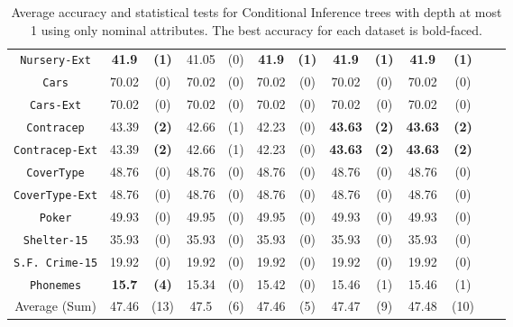 \begin{table*}
\begin{tabular}{c|cc|cc|cc|cc|cc|cc}
{\tt Nursery-Ext}  &{\bf 41.9}  & {\bf (1)} & 41.05       & (0)       & {\bf 41.9}  & {\bf (1)} & {\bf 41.9}  & {\bf (1)} & {\bf 41.9}  & {\bf (1)} &             &           \\
{\tt Cars}         &70.02       & (0)       & 70.02       & (0)       & 70.02       & (0)       & 70.02       & (0)       & 70.02       & (0)       &             &           \\
{\tt Cars-Ext}     &70.02       & (0)       & 70.02       & (0)       & 70.02       & (0)       & 70.02       & (0)       & 70.02       & (0)       &             &           \\
{\tt Contracep}    &43.39       & {\bf (2)} & 42.66       & (1)       & 42.23       & (0)       & {\bf 43.63} & {\bf (2)} & {\bf 43.63} & {\bf (2)} &             &           \\
{\tt Contracep-Ext}&43.39       & {\bf (2)} & 42.66       & (1)       & 42.23       & (0)       & {\bf 43.63} & {\bf (2)} & {\bf 43.63} & {\bf (2)} &             &           \\
{\tt CoverType}    &48.76       & (0)       & 48.76       & (0)       & 48.76       & (0)       & 48.76       & (0)       & 48.76       & (0)       &             &           \\
{\tt CoverType-Ext}&48.76       & (0)       & 48.76       & (0)       & 48.76       & (0)       & 48.76       & (0)       & 48.76       & (0)       &             &           \\
{\tt Poker}        &49.93       & (0)       & 49.95       & (0)       & 49.95       & (0)       & 49.93       & (0)       & 49.93       & (0)       &             &           \\  
{\tt Shelter-15}   &35.93       & (0)       & 35.93       & (0)       & 35.93       & (0)       & 35.93       & (0)       & 35.93       & (0)       &             &           \\   
{\tt S.F. Crime-15}&19.92       & (0)       & 19.92       & (0)       & 19.92       & (0)       & 19.92       & (0)       & 19.92       & (0)       &             &           \\ 
{\tt Phonemes}     &{\bf 15.7}  & {\bf (4)} & 15.34       & (0)       & 15.42       & (0)       & 15.46       & (1)       & 15.46       & (1)       &             &           \\ 
\hline
Average (Sum)      & 47.46      & (13)      & 47.5        & (6)       & 47.46       & (5)       & 47.47       & (9)       & 47.48       & (10)      &             &
\end{tabular}
\caption{Average accuracy and statistical tests  for  Conditional Inference trees with depth at most 1 using only nominal attributes. The best accuracy for each dataset is bold-faced.}
\label{tab:ctree-1}
\end{table*}


